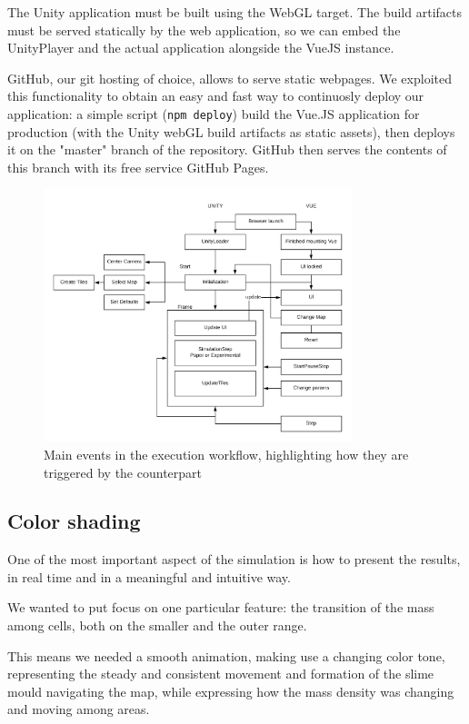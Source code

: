 The Unity application must be built using the WebGL target. The build artifacts must be served statically by the web application, so we can embed the UnityPlayer and the actual application alongside the VueJS instance.

GitHub, our git hosting of choice, allows to serve static webpages. We exploited this functionality to obtain an easy and fast way to continuosly deploy our application: a simple script (\texttt{npm deploy}) build the Vue.JS application for production (with the Unity webGL build artifacts as static assets), then deploys it on the "master" branch of the repository. GitHub then serves the contents of this branch with its free service GitHub Pages.


\begin{figure}
  \centering
    \includegraphics[width=0.8\textwidth]{events}%
    
  \caption{Main events in the execution workflow, highlighting how they are triggered by the counterpart}
  \label{fig:events}
\end{figure}

\subsection{Color shading}

One of the most important aspect of the simulation is how to present the results, in real time and in a meaningful and intuitive way. 

We wanted to put focus on one particular feature: the transition of the mass among cells, both on the smaller and the outer range.

This means we needed a smooth animation, making use a changing color tone, representing the steady and consistent movement and formation of the slime mould navigating the map, while expressing how the mass density was changing and moving among areas.

